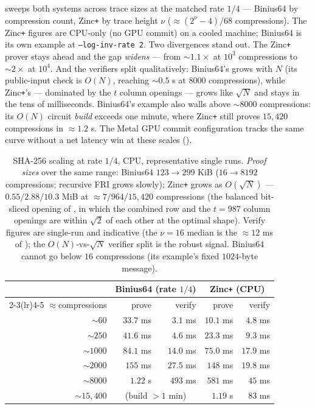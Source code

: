 sweeps both systems across trace sizes at the matched rate
$1/4$ --- Binius64 by compression count, Zinc\texttt{+} by trace height $\nu$
($\approx(2^\nu-4)/68$ compressions). The Zinc\texttt{+} figures are CPU-only
(no GPU commit) on a cooled machine; Binius64 is its own example at
\texttt{--log-inv-rate 2}. Two divergences stand out. The Zinc\texttt{+}
prover stays ahead and the gap \emph{widens} --- from $\sim\!1.1\times$ at
$10^3$ compressions to $\sim\!2\times$ at $10^4$. And the verifiers split
qualitatively: Binius64's grows with $N$ (its public-input check is $O(N)$,
reaching $\sim\!0.5$ s at $8000$ compressions), while Zinc\texttt{+}'s ---
dominated by the $t$ column openings --- grows like $\sqrt N$ and stays in the
tens of milliseconds. Binius64's example also walls above $\sim\!8000$
compressions: its $O(N)$ circuit \emph{build} exceeds one minute, where
Zinc\texttt{+} still proves $15{,}420$ compressions in $\approx 1.2$ s. The
Metal GPU commit configuration tracks the same curve without a net latency
win at these scales ().

\begin{table}[h]
\centering
\renewcommand{\arraystretch}{1.2}
\begin{tabular}{r r r r r}
\toprule
 & \multicolumn{2}{c}{Binius64 (rate $1/4$)} & \multicolumn{2}{c}{Zinc\texttt{+} (CPU)} \\
\cmidrule(lr){2-3}\cmidrule(lr){4-5}
$\approx$compressions & prove & verify & prove & verify \\
\midrule
$\sim\!60$    & $33.7$ ms & $3.1$ ms  & $10.1$ ms & $4.8$ ms \\
$\sim\!250$   & $41.6$ ms & $4.6$ ms  & $23.3$ ms & $9.3$ ms \\
$\sim\!1000$  & $84.1$ ms & $14.0$ ms & $75.0$ ms & $17.9$ ms \\
$\sim\!2000$  & $155$ ms  & $27.5$ ms & $148$ ms  & $19.8$ ms \\
$\sim\!8000$  & $1.22$ s  & $493$ ms  & $581$ ms  & $45$ ms \\
$\sim\!15{,}400$ & \multicolumn{2}{c}{(build $>1$ min)} & $1.19$ s & $83$ ms \\
\bottomrule
\end{tabular}
\caption{SHA-256 scaling at rate $1/4$, CPU, representative single runs.
\emph{Proof sizes} over the same range: Binius64 $123\!\to\!299$ KiB
($16\!\to\!8192$ compressions; recursive FRI grows slowly); Zinc\texttt{+}
grows as $O(\sqrt N)$ --- $0.55/2.88/10.3$ MiB at $\approx\!7/964/15{,}420$
compressions (the balanced bit-sliced opening of , in
which the combined row and the $t=987$ column openings are within $\sqrt2$ of
each other at the optimal shape). Verify figures
are single-run and indicative (the $\nu{=}16$ median is the $\approx\!12$ ms
of ); the $O(N)$-vs-$\sqrt N$ verifier split is the
robust signal. Binius64 cannot go below $16$ compressions (its example's fixed
$1024$-byte message).}
\label{tab:scaling}
\end{table}

